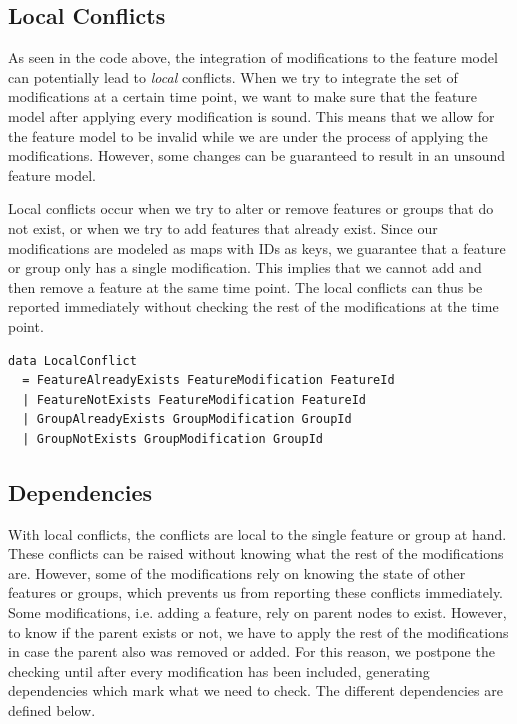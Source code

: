 \documentclass[a4paper,english]{ifimaster}
\begin{document}
\subsection{Local Conflicts}%
\label{sub:local_conflicts}

As seen in the code above, the integration of modifications to the feature model can potentially lead to \textit{local} conflicts. When we try to integrate the set of modifications at a certain time point, we want to make sure that the feature model after applying every modification is sound. This means that we allow for the feature model to be invalid while we are under the process of applying the modifications. However, some changes can be guaranteed to result in an unsound feature model.

Local conflicts occur when we try to alter or remove features or groups that do not exist, or when we try to add features that already exist. Since our modifications are modeled as maps with IDs as keys, we guarantee that a feature or group only has a single modification. This implies that we cannot add and then remove a feature at the same time point. The local conflicts can thus be reported immediately without checking the rest of the modifications at the time point.

\begin{verbatim}
data LocalConflict
  = FeatureAlreadyExists FeatureModification FeatureId
  | FeatureNotExists FeatureModification FeatureId
  | GroupAlreadyExists GroupModification GroupId
  | GroupNotExists GroupModification GroupId
\end{verbatim}

\subsection{Dependencies}%
\label{sub:dependencies}

With local conflicts, the conflicts are local to the single feature or group at hand. These conflicts can be raised without knowing what the rest of the modifications are. However, some of the modifications rely on knowing the state of other features or groups, which prevents us from reporting these conflicts immediately. Some modifications, i.e. adding a feature, rely on parent nodes to exist. However, to know if the parent exists or not, we have to apply the rest of the modifications in case the parent also was removed or added. For this reason, we postpone the checking until after every modification has been included, generating dependencies which mark what we need to check. The different dependencies are defined below.
\end{document}
